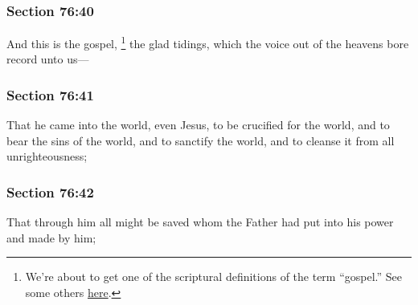 	\subsubsection{Section 76:40} %
		\label{DC76-40}

		And this is the gospel,%
			\footnote{%
				We're about to get one of the scriptural definitions of the term ``gospel.'' See some others \hyperref[GOSPEL-definition]{here}.
				}
		the glad tidings, which the voice out of the heavens bore record unto us---


	\subsubsection{Section 76:41} %
		\label{DC76-41}

		That he came into the world, even Jesus, to be crucified for the world, and to bear the sins of the world, and to sanctify the world, and to cleanse it from all unrighteousness;


	\subsubsection{Section 76:42} %
		\label{DC76-42}

		That through him all might be saved whom the Father had put into his power and made by him;


